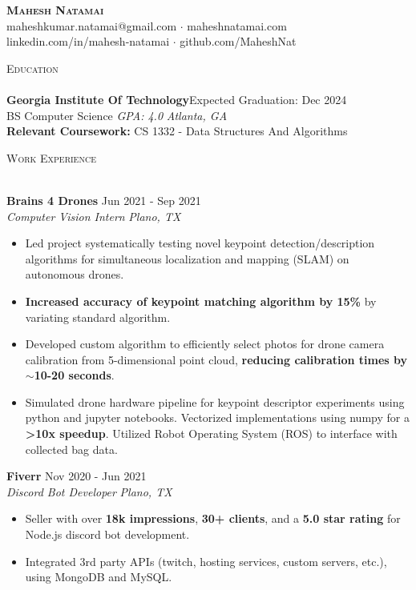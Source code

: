 \documentclass[a4paper]{article}
\newcommand{\lineunder} {
    \vspace*{-8pt} \\
    \hspace*{-18pt} \hrulefill \\
}
\newcommand{\header} [1] {
    {\hspace*{-18pt}\vspace*{6pt} \textsc{#1}}
    \vspace*{-6pt} \lineunder
}
\begin{document}
\vspace*{-40pt}

    

\vspace*{-10pt}
\begin{center}
	\textbf{\Huge \scshape {Mahesh Natamai}} \\
	maheshkumar.natamai@gmail.com $\cdot$ maheshnatamai.com \\ linkedin.com/in/mahesh-natamai $\cdot$ github.com/MaheshNat\\
\end{center}

\header{Education}
\textbf{Georgia Institute Of Technology}\hfill  Expected Graduation: Dec 2024\\
BS Computer Science \textit{GPA: 4.0} \hfill \textit{Atlanta, GA} \\ 
\vspace{1mm} 
\textbf{Relevant Coursework:}
 CS 1332 - Data Structures And Algorithms\\
\vspace{1mm} 

\header{Work Experience}
\vspace{1mm}

\textbf{Brains 4 Drones} \hfill Jun 2021 - Sep 2021\\
\textit{Computer Vision Intern} \hfill \textit{Plano, TX} \\
\vspace{-1mm}
\begin{itemize} \itemsep -1pt
	\item Led project systematically testing novel keypoint detection/description algorithms for simultaneous localization and mapping (SLAM) on autonomous drones.
	\item \textbf{Increased accuracy of keypoint matching algorithm by 15\%} by variating standard algorithm.
        \item Developed custom algorithm to efficiently select photos for drone camera calibration from 5-dimensional point cloud, \textbf{reducing calibration times by $\sim{}$10-20 seconds}.
	\item Simulated drone hardware pipeline for keypoint descriptor experiments using python and jupyter notebooks. Vectorized implementations using numpy for a \textbf{>10x speedup}. Utilized Robot Operating System (ROS) to interface with collected bag data.
\end{itemize}
\textbf{Fiverr} \hfill Nov 2020 - Jun 2021\\
\textit{Discord Bot Developer} \hfill \textit{Plano, TX} \\
\vspace{-1mm}
\begin{itemize} \itemsep -1pt
	\item Seller with over \textbf{18k impressions}, \textbf{30+ clients}, and a \textbf{5.0 star rating} for Node.js discord bot development.
	\item Integrated 3rd party APIs (twitch, hosting services, custom servers, etc.), using MongoDB and MySQL.
\end{itemize}
\end{document}
